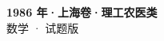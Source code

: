\documentclass[zihao=-4, a4paper]{ctexart}
\begin{document}
\begin{center}
  {\Large\bfseries 1986 年·上海卷·理工农医类}\\[4pt]
  {\large 数学 · 试题版}
\end{center}
\medskip
{}

\end{document}
